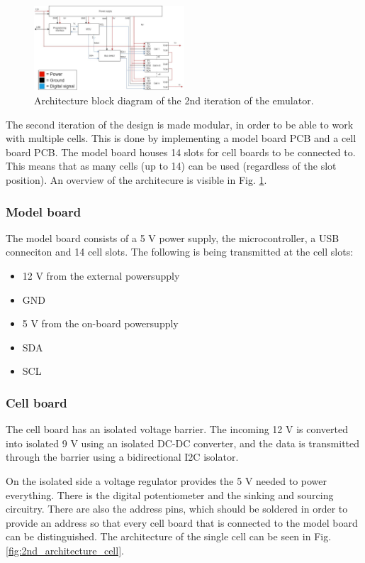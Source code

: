 \begin{figure}[h]
    \centering
    \includegraphics[width=0.5\textwidth]{architecture_2nd_iteration.png}
    \caption{Architecture block diagram of the 2nd iteration of the emulator.}
    \label{fig:2nd_architecture}
\end{figure}

The second iteration of the design is made modular, in order to be able to work
 with multiple cells. This is done by implementing a model board
PCB and a cell board PCB. The model board houses 14 slots for cell boards to be 
connected to. This means that as many cells (up to 14) can be used (regardless 
of the slot position). An overview of the architecure is visible in 
Fig. \ref{fig:2nd_architecture}.

    \subsubsection{Model board}
    The model board consists of a 5 V power supply, the microcontroller, a USB 
    conneciton and 14 cell slots. The following is being transmitted at the
    cell slots:

    \begin{itemize}
        \item 12 V from the external powersupply
        \item GND
        \item 5 V from the on-board powersupply
        \item SDA
        \item SCL
    \end{itemize}

    \subsubsection{Cell board}
    The cell board has an isolated voltage barrier. The incoming 12 V is 
    converted into isolated 9 V using an isolated DC-DC converter, and the data is
    transmitted through the barrier using a bidirectional I2C isolator.

    On the isolated side a voltage regulator provides 
    the 5 V needed to power everything. There is the digital potentiometer
    and the sinking and sourcing circuitry. There are also the address pins, which
    should be soldered in order to provide an address so that every cell board that 
    is connected to the model board can be distinguished.
    The architecture of the single cell can be seen in Fig. 
    \ref{fig:2nd_architecture_cell}.


